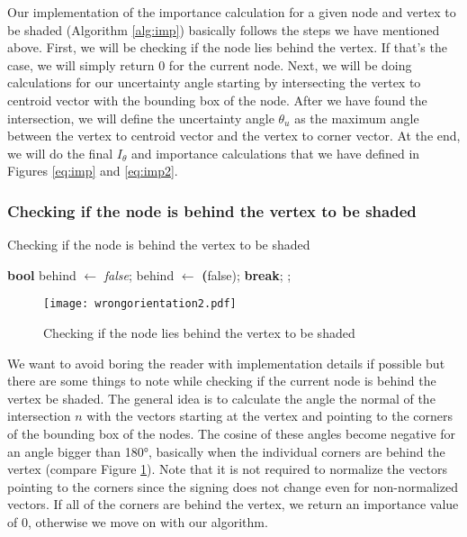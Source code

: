 Our implementation of the importance calculation for a given node and vertex to be shaded (Algorithm \ref{alg:imp}) basically follows the steps we have mentioned above. First, we will be checking if the node lies behind the vertex. If that's the case, we will simply return 0 for the current node. Next, we will be doing calculations for our uncertainty angle starting by intersecting the vertex to centroid vector with the bounding box of the node. After we have found the intersection, we will define the uncertainty angle $\theta_u$ as the maximum angle between the vertex to centroid vector and the vertex to corner vector. At the end, we will do the final $I_\theta$ and importance calculations that we have defined in Figures \ref{eq:imp} and \ref{eq:imp2}.

\subsubsection{Checking if the node is behind the vertex to be shaded}

\begin{algorithm}
	\caption{Checking if the node is behind the vertex to be shaded}
	\label{alg:behind}
	\begin{algorithmic}[1] %
		\State \textbf{bool} behind $\gets$ \textit{false};
		\State behind $\gets$ \textbf(false);
		\State \textbf{break};
		\EndIf
		\EndFor
		\State {};
		\EndIf
		\EndIf
	\end{algorithmic}
\end{algorithm}


\begin{figure}
	\begin{center}
		\texttt{[image: wrongorientation2.pdf]}
		\caption{Checking if the node lies behind the vertex to be shaded}
		\label{fig:wrongorientation2}
	\end{center}
\end{figure}

We want to avoid boring the reader with implementation details if possible but there are some things to note while checking if the current node is behind the vertex be shaded. The general idea is to calculate the angle the normal of the intersection $n$ with the vectors starting at the vertex and pointing to the corners of the bounding box of the nodes. The cosine of these angles become negative for an angle bigger than 180°, basically when the individual corners are behind the vertex (compare Figure \ref{fig:wrongorientation2}). Note that it is not required to normalize the vectors pointing to the corners since the signing does not change even for non-normalized vectors. If all of the corners are behind the vertex, we return an importance value of 0, otherwise we move on with our algorithm.

